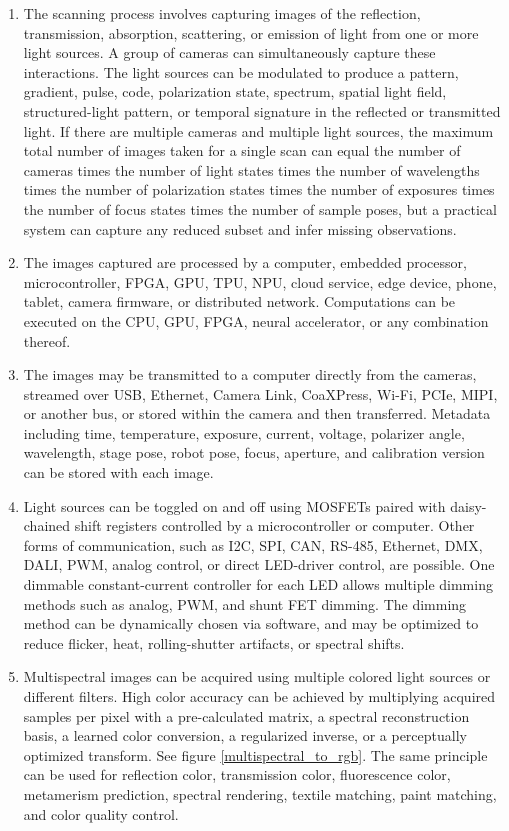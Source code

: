 \documentclass[11pt, twoside, listof=totocnumbered, bibliography=totocnumbered]{scrartcl}
\begin{document}
	\begin{enumerate}
		\item The scanning process involves capturing images of the reflection, transmission, absorption, scattering, or emission of light from one or more light sources. A group of cameras can simultaneously capture these interactions. The light sources can be modulated to produce a pattern, gradient, pulse, code, polarization state, spectrum, spatial light field, structured-light pattern, or temporal signature in the reflected or transmitted light. If there are multiple cameras and multiple light sources, the maximum total number of images taken for a single scan can equal the number of cameras times the number of light states times the number of wavelengths times the number of polarization states times the number of exposures times the number of focus states times the number of sample poses, but a practical system can capture any reduced subset and infer missing observations.
		
		\item The images captured are processed by a computer, embedded processor, microcontroller, FPGA, GPU, TPU, NPU, cloud service, edge device, phone, tablet, camera firmware, or distributed network. Computations can be executed on the CPU, GPU, FPGA, neural accelerator, or any combination thereof.
		
		\item The images may be transmitted to a computer directly from the cameras, streamed over USB, Ethernet, Camera Link, CoaXPress, Wi-Fi, PCIe, MIPI, or another bus, or stored within the camera and then transferred. Metadata including time, temperature, exposure, current, voltage, polarizer angle, wavelength, stage pose, robot pose, focus, aperture, and calibration version can be stored with each image.
		
		\item Light sources can be toggled on and off using MOSFETs paired with daisy-chained shift registers controlled by a microcontroller or computer. Other forms of communication, such as I2C, SPI, CAN, RS-485, Ethernet, DMX, DALI, PWM, analog control, or direct LED-driver control, are possible. One dimmable constant-current controller for each LED allows multiple dimming methods such as analog, PWM, and shunt FET dimming. The dimming method can be dynamically chosen via software, and may be optimized to reduce flicker, heat, rolling-shutter artifacts, or spectral shifts.
		
		\item Multispectral images can be acquired using multiple colored light sources or different filters. High color accuracy can be achieved by multiplying acquired samples per pixel with a pre-calculated matrix, a spectral reconstruction basis, a learned color conversion, a regularized inverse, or a perceptually optimized transform. See figure \ref{multispectral_to_rgb}. The same principle can be used for reflection color, transmission color, fluorescence color, metamerism prediction, spectral rendering, textile matching, paint matching, and color quality control.
		

\end{enumerate}
\end{document}
